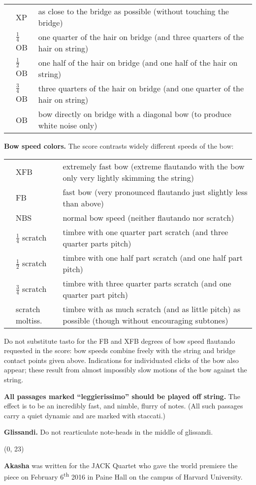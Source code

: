\documentclass[10pt]{article}
\begin{document}
\begin{textblock}{23}
\begin{tabu}{l l l}
\phantom{M} & XP & as close to the bridge as possible (without touching the bridge) \\
            & $\frac{1}{4}$OB & one quarter of the hair on bridge (and three quarters of the hair on string) \\
            & $\frac{1}{2}$OB & one half of the hair on bridge (and one half of the hair on string) \\
            & $\frac{3}{4}$OB & three quarters of the hair on bridge (and one quarter of the hair on string) \\
            & OB & bow directly on bridge with a diagonal bow (to produce white noise only) \\
\end{tabu}

\textbf{Bow speed colors.} The score contrasts widely different speeds of the bow:
 
\begin{tabu}{l l l}
\phantom{M} & XFB & extremely fast bow (extreme flautando with the bow only very lightly skimming the string) \\
            & FB & fast bow (very pronounced flautando just slightly less than above) \\
            & NBS & normal bow speed (neither flautando nor scratch) \\
            & $\frac{1}{4}$ scratch & timbre with one quarter part scratch (and three quarter parts pitch) \\
            & $\frac{1}{2}$ scratch & timbre with one half part scratch (and one half part pitch) \\
            & $\frac{3}{4}$ scratch & timbre with three quarter parts scratch (and one quarter part pitch) \\
            & scratch moltiss. & timbre with as much scratch (and as little pitch) as possible (though without encouraging subtones) \\
\end{tabu}

Do not substitute tasto for the FB and XFB degrees of bow speed flautando
requested in the score: bow speeds combine freely with the string and bridge
contact points given above. Indications for individuated clicks of the bow also
appear; these result from almost impossibly slow motions of the bow against the
string.

\textbf{All passages marked ``leggierissimo'' should be played off string.} The
effect is to be an incredibly fast, and nimble, flurry of notes. (All such
passages carry a quiet dynamic and are marked with staccati.)

\textbf{Glissandi.} Do not rearticulate note-heads in the middle of glissandi.

\end{textblock}

\begin{textblock}{23}(0, 23)

\textbf{Akasha} was written for the JACK Quartet who gave the world premiere
the piece on February 6\textsuperscript{th} 2016 in Paine Hall on the campus of
Harvard University.

\end{textblock}
\end{document}
